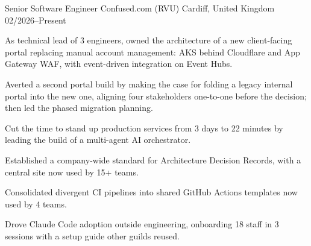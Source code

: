 


\begin{cventries}


\cventry%
  {Senior Software Engineer} %
  {Confused.com (RVU)} %
  {Cardiff, United Kingdom} %
  {02/2026--Present} %
  {
    \begin{cvitems}
      \item As technical lead of 3 engineers, owned the architecture of a new client-facing portal replacing manual account management: AKS behind Cloudflare and App Gateway WAF, with event-driven integration on Event Hubs.
      \item Averted a second portal build by making the case for folding a legacy internal portal into the new one, aligning four stakeholders one-to-one before the decision; then led the phased migration planning.
      \item Cut the time to stand up production services from 3 days to 22 minutes by leading the build of a multi-agent AI orchestrator.
      \item Established a company-wide standard for Architecture Decision Records, with a central site now used by 15+ teams.
      \item Consolidated divergent CI pipelines into shared GitHub Actions templates now used by 4 teams.
      \item Drove Claude Code adoption outside engineering, onboarding 18 staff in 3 sessions with a setup guide other guilds reused.
    \end{cvitems}
  }



\end{cventries}
